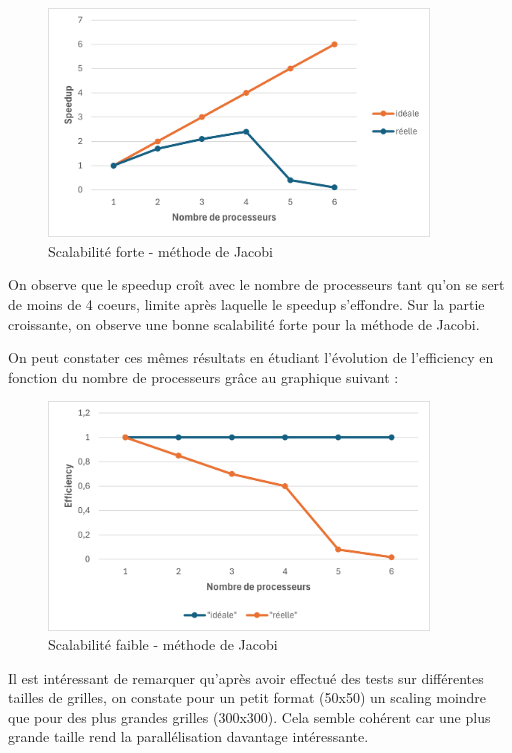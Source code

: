\documentclass{article}
\begin{document}
\begin{figure}[H]
    \centering
    \includegraphics[width=0.9\textwidth]{strong_scaling_jacobi.png}
    \caption{Scalabilité forte - méthode de Jacobi}
    \label{fig:strongJac}
\end{figure}

On observe que le speedup croît avec le nombre de processeurs tant qu'on se sert de moins de 4 coeurs, limite après laquelle le speedup s'effondre. Sur la partie croissante, on observe une bonne scalabilité forte pour la méthode de Jacobi.

On peut constater ces mêmes résultats en étudiant l'évolution de l'efficiency en fonction du nombre de processeurs grâce au graphique suivant :

\begin{figure}[H]
    \centering
    \includegraphics[width=0.9\textwidth]{weak_scaling_jacobi.png}
    \caption{Scalabilité faible - méthode de Jacobi}
    \label{fig:weakJac}
\end{figure}

Il est intéressant de remarquer qu'après avoir effectué des tests sur différentes tailles de grilles, on constate pour un petit format (50x50) un scaling moindre que pour des plus grandes grilles (300x300). Cela semble cohérent car une plus grande taille rend la parallélisation davantage intéressante.
\end{document}

